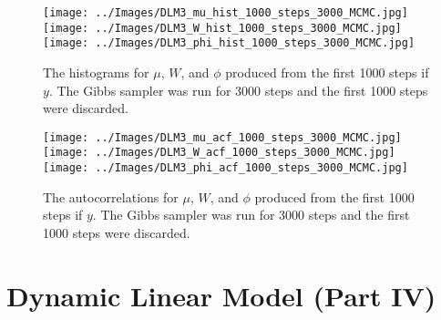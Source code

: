 \documentclass{article}
\begin{document}
\begin{figure}[!h]
\begin{center}
\texttt{[image: ../Images/DLM3\_mu\_hist\_1000\_steps\_3000\_MCMC.jpg]}
\texttt{[image: ../Images/DLM3\_W\_hist\_1000\_steps\_3000\_MCMC.jpg]}
\texttt{[image: ../Images/DLM3\_phi\_hist\_1000\_steps\_3000\_MCMC.jpg]}
\end{center}
\label{DLM3:histograms}
\caption{The histograms for $\mu$, $W$, and $\phi$ produced from the first 1000 steps if $y$.  The Gibbs sampler was run for 3000 steps and the first 1000 steps were discarded.}
\end{figure}

\begin{figure}[!h]
\begin{center}
\texttt{[image: ../Images/DLM3\_mu\_acf\_1000\_steps\_3000\_MCMC.jpg]}
\texttt{[image: ../Images/DLM3\_W\_acf\_1000\_steps\_3000\_MCMC.jpg]}
\texttt{[image: ../Images/DLM3\_phi\_acf\_1000\_steps\_3000\_MCMC.jpg]}
\end{center}
\caption{The autocorrelations for $\mu$, $W$, and $\phi$ produced from the first 1000 steps if $y$.  The Gibbs sampler was run for 3000 steps and the first 1000 steps were discarded.}
\end{figure}


\section{Dynamic Linear Model (Part IV)}
\end{document}
